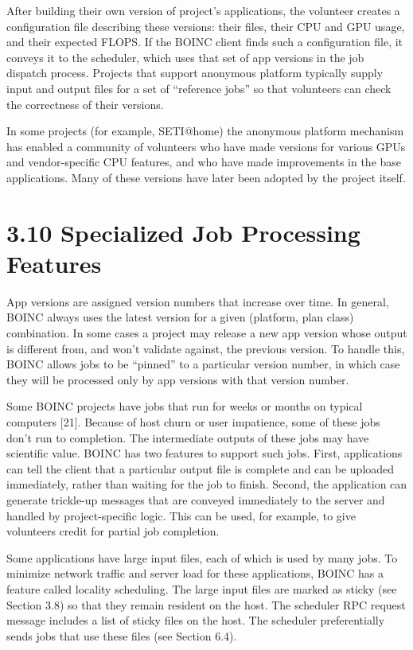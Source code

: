 \documentclass[
]{article}
\begin{document}
After building their own version of project's applications, the
volunteer creates a configuration file describing these versions: their
files, their CPU and GPU usage, and their expected FLOPS. If the BOINC
client finds such a configuration file, it conveys it to the scheduler,
which uses that set of app versions in the job dispatch process.
Projects that support anonymous platform typically supply input and
output files for a set of ``reference jobs'' so that volunteers can
check the correctness of their versions.

In some projects (for example, SETI@home) the anonymous platform
mechanism has enabled a community of volunteers who have made versions
for various GPUs and vendor-specific CPU features, and who have made
improvements in the base applications. Many of these versions have later
been adopted by the project itself.

\section{3.10 Specialized Job Processing
Features}\label{specialized-job-processing-features}

App versions are assigned version numbers that increase over time. In
general, BOINC always uses the latest version for a given (platform,
plan class) combination. In some cases a project may release a new app
version whose output is different from, and won't validate against, the
previous version. To handle this, BOINC allows jobs to be ``pinned'' to
a particular version number, in which case they will be processed only
by app versions with that version number.

Some BOINC projects have jobs that run for weeks or months on typical
computers {[}21{]}. Because of host churn or user impatience, some of
these jobs don't run to completion. The intermediate outputs of these
jobs may have scientific value. BOINC has two features to support such
jobs. First, applications can tell the client that a particular output
file is complete and can be uploaded immediately, rather than waiting
for the job to finish. Second, the application can generate trickle-up
messages that are conveyed immediately to the server and handled by
project-specific logic. This can be used, for example, to give
volunteers credit for partial job completion.

Some applications have large input files, each of which is used by many
jobs. To minimize network traffic and server load for these
applications, BOINC has a feature called locality scheduling. The large
input files are marked as sticky (see Section 3.8) so that they remain
resident on the host. The scheduler RPC request message includes a list
of sticky files on the host. The scheduler preferentially sends jobs
that use these files (see Section 6.4).
\end{document}
